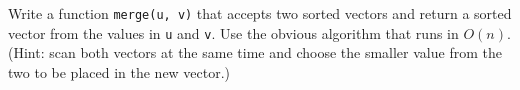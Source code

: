   Write a function \verb!merge(u, v)! that accepts two
  sorted vectors and return a sorted vector from the values in
  \verb!u! and \verb!v!.
  Use the obvious algorithm that runs in $O(n)$.
  (Hint: scan both vectors at the same time and choose the smaller
  value from the two to be placed in the new vector.)
